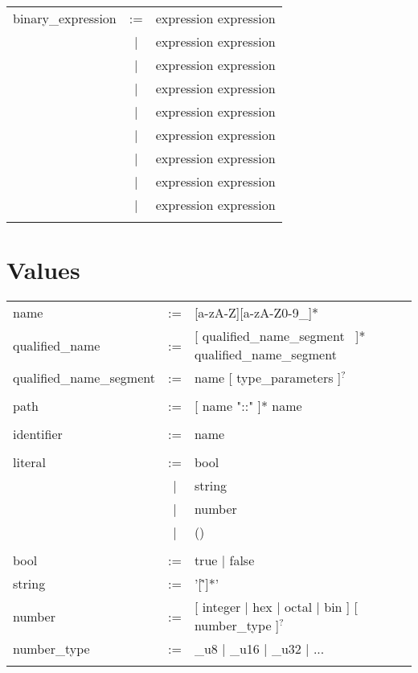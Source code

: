 \documentclass{article}
\begin{document}
\begin{table}[H]
\begin{tabular}{lcl}
        binary\_expression & := & expression \kw{+} expression \\
                           & | & expression \kw{-} expression \\
                           & | & expression \kw{*} expression \\
                           & | & expression \kw{\textbackslash} expression \\
                           & | & expression \kw{<} expression \\
                           & | & expression \kw{<=} expression \\
                           & | & expression \kw{>} expression \\
                           & | & expression \kw{\>=} expression \\
                           & | & expression \kw{=} expression \\ \\
    \end{tabular}
\end{table}

\newpage

\section*{Values}
\begin{table}[H]
    \centering
    \begin{tabular}{lcl}

        name & := & [a-zA-Z][a-zA-Z0-9\_]* \\
        qualified\_name & := &  [ qualified\_name\_segment \, \kw{::} ]* qualified\_name\_segment  \\
        qualified\_name\_segment & := & name [ type\_parameters ]$^?$ \\ \\

        path & := & [ name "::" ]* name \\ \\

        identifier & := & name \\ \\

        literal & := & bool \\
                & | & string \\
                & | & number \\
                & | & () \\ \\

        bool & := & true | false \\
        string & := & '[\^']*' \\
        number & := & [ integer | hex | octal | bin ] [ number\_type ]$^?$ \\
        number\_type & := & \_u8 | \_u16 | \_u32 | ... \\ \\

    \end{tabular}
\end{table}
\end{document}
